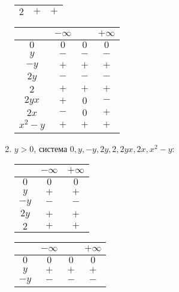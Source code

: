 \begin{enumerate}
\begin{center}
\begin{tabular}{|c|c|c|}
            \hline
            $2$ & $+$ & $+$\\
            \hline
        \end{tabular} 
            \quad
        \begin{tabular}{|c|c|c|c|}
            \hline
             & $-\infty$ & & $+\infty$\\
            \hline
            $0$ & $0$ & $0$ & $0$\\
            \hline
            $y$ & $-$ & $-$ & $-$\\
            \hline
            $-y$ & $+$ & $+$ & $+$\\
            \hline
            $2y$ & $-$ & $-$ & $-$\\
            \hline
            $2$ & $+$ & $+$ & $+$\\
            \hline
            $2yx$ & $+$ & $0$ & $-$\\
            \hline
            $2x$ & $-$ & $0$ & $+$\\
            \hline
            $x^2 - y$ & $+$ & $+$ & $+$\\
            \hline
        \end{tabular} 
            \quad    
    \end{center}
    \item $y > 0$, система $0, y, -y, 2y, 2, 2yx, 2x, x^2 - y$:
    \begin{center}
        \begin{tabular}{|c|c|c|}
            \hline
             & $-\infty$ & $+\infty$\\
            \hline
            $0$ & $0$ & $0$\\
            \hline
            $y$ & $+$ & $+$\\
            \hline
            $-y$ & $-$ & $-$\\
            \hline
            $2y$ & $+$ & $+$\\
            \hline
            $2$ & $+$ & $+$\\
            \hline
        \end{tabular} 
            \quad
        \begin{tabular}{|c|c|c|c|}
            \hline
             & $-\infty$ & & $+\infty$\\
            \hline
            $0$ & $0$ & $0$ & $0$\\
            \hline
            $y$ & $+$ & $+$ & $+$\\
            \hline
            $-y$ & $-$ & $-$ & $-$\\

\end{tabular}
\end{center}
\end{enumerate}

